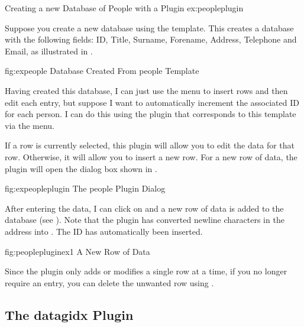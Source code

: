 \begin{example}
 {Creating a new Database of People with a Plugin}
 {ex:peopleplugin}

   Suppose you create a new database using the 
   template. This creates a database with the following fields:
   ID, Title, Surname, Forename, Address, Telephone and Email, as
   illustrated in .

\FloatFig
 {fig:expeople}
 {%
 }
 {Database Created From people Template}

   Having created this database, I can just use the 
    menu to insert rows and then edit each entry,
   but suppose I want to automatically increment the associated ID
   for each person. I can do this using the  plugin 
   that corresponds to this template via the  menu.

   If a row is currently selected, this plugin will allow you to edit
   the data for that row. Otherwise, it will allow you to insert a new
   row. For a new row of data, the  plugin will open
   the dialog box shown in .

\FloatFig
 {fig:expeopleplugin}
 {%
 }
 {The people Plugin Dialog}

   After entering the data, I can click on 
   and a new row of data is added to the database (see 
   ). Note that the plugin has converted newline
   characters in the address into . The ID has automatically 
   been inserted.

\FloatFig
 {fig:peoplepluginex1}
 {%
 }
 {A New Row of Data}

   Since the  plugin only adds or modifies a single
   row at a time, if you no longer require an entry, you can delete the
   unwanted row using .
\end{example}

\subsection{The datagidx Plugin}\label{sec:datagidxplugin}

